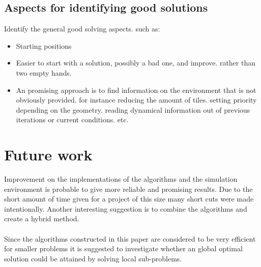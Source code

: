 \subsection{Aspects for identifying good solutions}
Identify the general good solving aspects. such as:
\begin{itemize}
\item Starting positions
\item Easier to start with a solution, possibly a bad one, and improve. rather than two empty hands.
\item An promising approach is to find information on the environment that is not obviously provided. for instance reducing the amount of tiles. setting priority depending on the geometry. reading dynamical information out of previous iterations or current conditions. etc.
\end{itemize}

\section{Future work}
Improvement on the implementations of the algorithms and the simulation environment is probable to give more reliable and promising results. Due to the short amount of time given for a project of this size many short cuts were made intentionally. Another interesting suggestion is to combine the algorithms and create a hybrid method. \\
\\Since the algorithms constructed in this paper are considered to be very efficient for smaller problems it is suggested to investigate whether an global optimal solution could be attained by solving local sub-problems.

